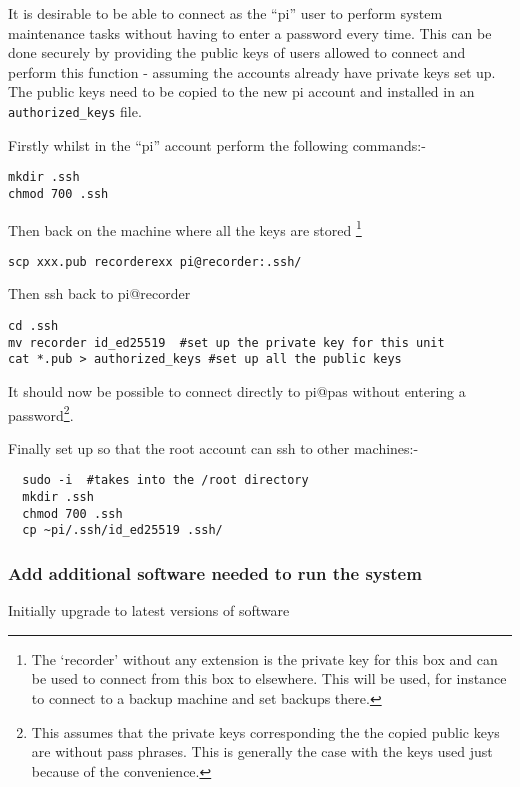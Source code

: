 \documentclass[Draft]{akc}
\begin{document}
It is desirable to be able to connect as the ``pi'' user to perform system maintenance tasks without having
to enter a password every time.  This can be done securely by providing the public keys of users
allowed to connect and perform this function - assuming the accounts already
have private keys set up. The public keys need to be copied to the new pi
account and installed in an \texttt{authorized\_keys} file.

Firstly whilst in the ``pi'' account perform the following commands:-

\begin{lstlisting}
mkdir .ssh
chmod 700 .ssh
\end{lstlisting}

Then back on the machine where all the keys are stored \footnote{The `recorder'
without any extension is the private key for this box and can be used to connect
from this box to elsewhere. This will be used, for instance to connect to a
backup machine and set backups there.}

\begin{lstlisting}
scp xxx.pub recorderexx pi@recorder:.ssh/
\end{lstlisting}

Then ssh back to pi@recorder

\begin{lstlisting}
cd .ssh
mv recorder id_ed25519  #set up the private key for this unit
cat *.pub > authorized_keys #set up all the public keys
\end{lstlisting}

It should now be possible to connect directly to pi@pas without entering a password\footnote{This
assumes that the private keys corresponding the the copied public keys are without pass phrases.
This is generally the case with the keys used just because of the convenience.}.

Finally set up so that the root account can ssh to other machines:-

\begin{lstlisting}
  sudo -i  #takes into the /root directory
  mkdir .ssh
  chmod 700 .ssh
  cp ~pi/.ssh/id_ed25519 .ssh/
\end{lstlisting}

\subsubsection{Add additional software needed to run the system}

Initially upgrade to latest versions of software
\end{document}
